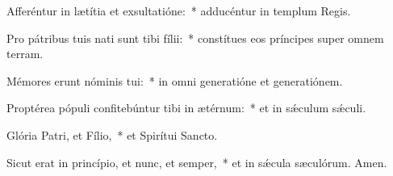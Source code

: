 \item Afferéntur in lætítia et exsultatióne:~* adducéntur in templum Regis.

\item Pro pátribus tuis nati sunt tibi fílii:~* constítues eos príncipes super omnem terram.

\item Mémores erunt nóminis tui:~* in omni generatióne et generatiónem.

\item Proptérea pópuli confitebúntur tibi in ætérnum:~* et in sǽculum sǽculi.

\item Glória Patri, et Fílio,~* et Spirítui Sancto.

\item Sicut erat in princípio, et nunc, et semper,~* et in sǽcula sæculórum. Amen.

